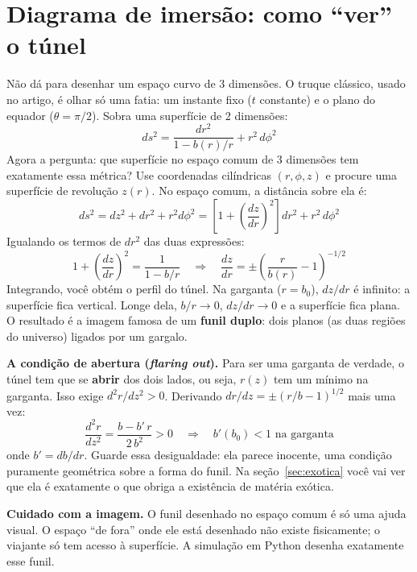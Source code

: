 \documentclass[11pt,a4paper]{article}
\begin{document}
\section{Diagrama de imersão: como ``ver'' o túnel}

Não dá para desenhar um espaço curvo de 3 dimensões. O truque clássico, usado no artigo, é olhar só uma fatia: um
instante fixo ($t$ constante) e o plano do equador ($\theta = \pi/2$). Sobra uma superfície de 2 dimensões:
\begin{equation*}
ds^2 = \frac{dr^2}{1 - b(r)/r} + r^2\,d\phi^2
\end{equation*}
Agora a pergunta: que superfície no espaço comum de 3 dimensões tem exatamente essa métrica? Use coordenadas
cilíndricas $(r, \phi, z)$ e procure uma superfície de revolução $z(r)$. No espaço comum, a distância sobre ela é:
\begin{equation*}
ds^2 = dz^2 + dr^2 + r^2 d\phi^2 = \left[1 + \left(\frac{dz}{dr}\right)^2\right] dr^2 + r^2\,d\phi^2
\end{equation*}
Igualando os termos de $dr^2$ das duas expressões:
\begin{equation}
1 + \left(\frac{dz}{dr}\right)^2 = \frac{1}{1 - b/r} \quad\Longrightarrow\quad
\frac{dz}{dr} = \pm\left(\frac{r}{b(r)} - 1\right)^{-1/2}
\end{equation}
Integrando, você obtém o perfil do túnel. Na garganta ($r = b_0$), $dz/dr$ é infinito: a superfície fica vertical.
Longe dela, $b/r \to 0$, $dz/dr \to 0$ e a superfície fica plana. O resultado é a imagem famosa de um \textbf{funil
duplo}: dois planos (as duas regiões do universo) ligados por um gargalo.

\textbf{A condição de abertura (\emph{flaring out}).} Para ser uma garganta de verdade, o túnel tem que se
\textbf{abrir} dos dois lados, ou seja, $r(z)$ tem um mínimo na garganta. Isso exige $d^2r/dz^2 > 0$. Derivando
$dr/dz = \pm(r/b - 1)^{1/2}$ mais uma vez:
\begin{equation}
\frac{d^2 r}{dz^2} = \frac{b - b'\,r}{2\,b^2} > 0 \quad\Longrightarrow\quad b'(b_0) < 1 \text{ na garganta}
\label{eq:abertura}
\end{equation}
onde $b' = db/dr$. Guarde essa desigualdade: ela parece inocente, uma condição puramente geométrica sobre a forma do
funil. Na seção~\ref{sec:exotica} você vai ver que ela é exatamente o que obriga a existência de matéria exótica.

\textbf{Cuidado com a imagem.} O funil desenhado no espaço comum é só uma ajuda visual. O espaço ``de fora'' onde ele
está desenhado não existe fisicamente; o viajante só tem acesso à superfície. A simulação em Python desenha exatamente
esse funil.
\end{document}
